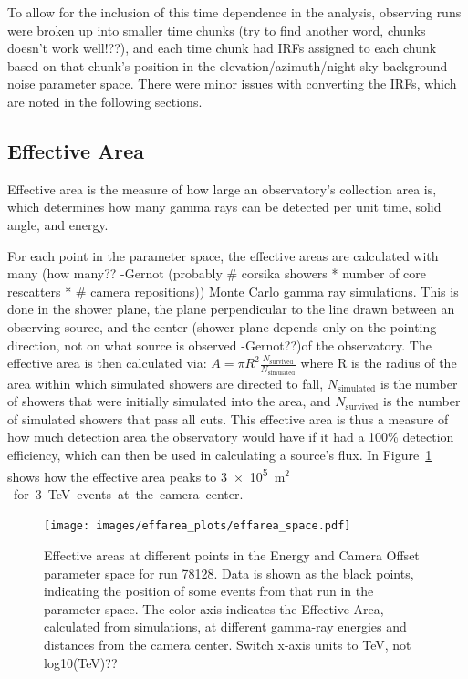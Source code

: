   To allow for the inclusion of this time dependence in the analysis, observing runs were broken up into smaller time {\color{red}chunks (try to find another word, chunks doesn't work well!??)}, and each time chunk had IRFs assigned to each chunk based on that chunk's position in the elevation/azimuth/night-sky-background-noise parameter space.
  There were minor issues with converting the IRFs, which are noted in the following sections.

  \FloatBarrier
  
  \subsection{Effective Area}\label{subsec:effarea}
    Effective area is the measure of how large an observatory's collection area is, which determines how many gamma rays can be detected per unit time, solid angle, and energy.

    For each point in the parameter space, the effective areas are calculated with many {\color{red}(how many?? -Gernot (probably # corsika showers * number of core rescatters * # camera repositions))} Monte Carlo gamma ray simulations.
    This is done in the shower plane, {\color{red} the plane perpendicular to the line drawn between an observing source, and the center (shower plane depends only on the pointing direction, not on what source is observed -Gernot??)}of the observatory.
    The effective area is then calculated via:
    $A=\pi R^2 \frac{N_{\text{survived}}}{N_{\text{simulated}}}$
    where R is the radius of the area within which simulated showers are directed to fall, $N_{\text{simulated}}$ is the number of showers that were initially simulated into the area, and $N_{\text{survived}}$ is the number of simulated showers that pass all cuts.
    This effective area is thus a measure of how much detection area the observatory would have if it had a 100\% detection efficiency, which can then be used in calculating a source's flux.
    In Figure~\ref{fig:effarea_paramspace} shows how the effective area peaks to \nicetilde{}\SI{3e5}{m${}^2$} for \SI{3}{\TeV} events at the camera center.

    \begin{figure}[ht]
      \centering
      \texttt{[image: images/effarea\_plots/effarea\_space.pdf]}
      \caption[Effective Area Parameter Space]{
        Effective areas at different points in the Energy and Camera Offset parameter space for run 78128.
        Data is shown as the black points, indicating the position of some events from that run in the parameter space.
        The color axis indicates the Effective Area, calculated from simulations, at different gamma-ray energies and distances from the camera center.
        {\color{red}Switch x-axis units to TeV, not log10(TeV)??}
      }
      \label{fig:effarea_paramspace}
    \end{figure}

